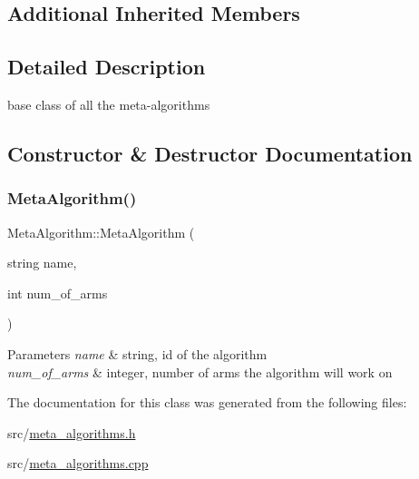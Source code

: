 \subsection*{Additional Inherited Members}


\subsection{Detailed Description}
base class of all the meta-\/algorithms 

\subsection{Constructor \& Destructor Documentation}
\mbox{\label{class_meta_algorithm_a747f056c3483bf967b5cc69fef251cd0}} 
\subsubsection{\texorpdfstring{Meta\+Algorithm()}{MetaAlgorithm()}}
{\footnotesize\ttfamily Meta\+Algorithm\+::\+Meta\+Algorithm (\begin{DoxyParamCaption}\item[{string}]{name,  }\item[{int}]{num\+\_\+of\+\_\+arms }\end{DoxyParamCaption})}


\begin{DoxyParams}{Parameters}
{\em name} & string, id of the algorithm \\
\hline
{\em num\+\_\+of\+\_\+arms} & integer, number of arms the algorithm will work on \\
\hline
\end{DoxyParams}


The documentation for this class was generated from the following files\+:\begin{DoxyCompactItemize}
\item 
src/\mbox{\hyperlink{meta__algorithms_8h}{meta\+\_\+algorithms.\+h}}\item 
src/\mbox{\hyperlink{meta__algorithms_8cpp}{meta\+\_\+algorithms.\+cpp}}\end{DoxyCompactItemize}
